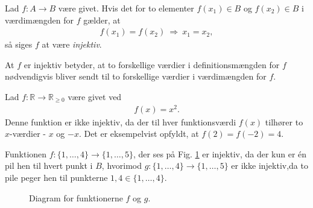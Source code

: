 \begin{defn}
	Lad $f:A \to B$ være givet. Hvis det for to elementer $f(x_1)\in B$ og $f(x_2)\in B$ i 		    værdimængden for $f$ gælder, at
	\begin{align*}
		f(x_1) = f(x_2) \ \Rightarrow \ x_1 = x_2,
	\end{align*}	 
	så siges $f$ at være \textit{injektiv}. 
\end{defn}
At $f$ er injektiv betyder, at to forskellige værdier i definitionsmængden for $f$ nødvendigvis bliver sendt til to forskellige værdier i værdimængden for $f$.
\begin{exa}
	Lad $f:\mathbb{R} \to \mathbb{R}_{\geq 0}$ være givet ved
	\begin{align*}
	f(x) = x^2.
	\end{align*}
	Denne funktion er ikke injektiv, da der til hver funktionsværdi $f(x)$ tilhører to $x$-værdier - $x$ og $-x$. Det er 	eksempelvist opfyldt, at $f(2) = f(-2) = 4$. 
\end{exa}
\begin{exa}
	Funktionen $f: \{1,\hdots,4\} \to \{1,\hdots, 5\}$, der ses på Fig. \ref{fig:inj}
	 er injektiv,  da der kun er én pil hen til hvert
	punkt i $B$, hvorimod
	 $g:\{1,\hdots,4\} \to \{1,\hdots, 5\}$ er ikke injektiv,da to pile peger hen til punkterne $1,4\in \{1,\hdots,4\}$.
	\begin{figure}[H]
		\centering
		\caption{Diagram for funktionerne $f$ og $g$.}
		\label{fig:inj}
	\end{figure} 
\end{exa}

